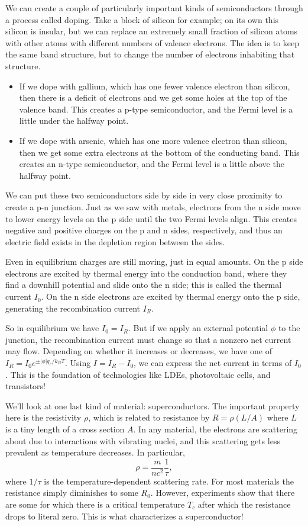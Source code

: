 \documentclass[../p052main.tex]{subfiles}
\begin{document}
We can create a couple of particularly important kinds of semiconductors through a process called doping.
Take a block of silicon for example; on its own this silicon is insular, but we can replace an extremely small fraction of silicon atoms with other atoms with different numbers of valence electrons.
The idea is to keep the same band structure, but to change the number of electrons inhabiting that structure.
\begin{itemize}
    \item If we dope with gallium, which has one fewer valence electron than silicon, then there is a deficit of electrons and we get some holes at the top of the valence band.
    This creates a p-type semiconductor, and the Fermi level is a little under the halfway point.

    \item If we dope with arsenic, which has one more valence electron than silicon, then we get some extra electrons at the bottom of the conducting band.
    This creates an n-type semiconductor, and the Fermi level is a little above the halfway point.
\end{itemize}
We can put these two semiconductors side by side in very close proximity to create a p-n junction.
Just as we saw with metals, electrons from the n side move to lower energy levels on the p side until the two Fermi levels align.
This creates negative and positive charges on the p and n sides, respectively, and thus an electric field exists in the depletion region between the sides.

Even in equilibrium charges are still moving, just in equal amounts.
On the p side electrons are excited by thermal energy into the conduction band, where they find a downhill potential and slide onto the n side; this is called the thermal current $I_0$.
On the n side electrons are excited by thermal energy onto the p side, generating the recombination current $I_R$.

So in equilibrium we have $I_0 = I_R$.
But if we apply an external potential $\phi$ to the junction, the recombination current must change so that a nonzero net current may flow.
Depending on whether it increases or decreases, we have one of $I_R = I_0 e^{\pm |\phi| q_e / k_B T}$.
Using $I = I_R - I_0$, we can express the net current in terms of $I_0$.
This is the foundation of technologies like LDEs, photovoltaic cells, and transistors!

We'll look at one last kind of material: superconductors.
The important property here is the resistivity $\rho$, which is related to resistance by $R = \rho (L / A)$ where $L$ is a tiny length of a cross section $A$.
In any material, the electrons are scattering about due to interactions with vibrating nuclei, and this scattering gets less prevalent as temperature decreases.
In particular,
\[ \rho = \frac{m}{nc^2} \frac{1}{\tau}, \]
where $1 / \tau$ is the temperature-dependent scattering rate.
For most materials the resistance simply diminishes to some $R_0$.
However, experiments show that there are some for which there is a critical temperature $T_c$ after which the resistance drops to literal zero.
This is what characterizes a superconductor!
\end{document}
